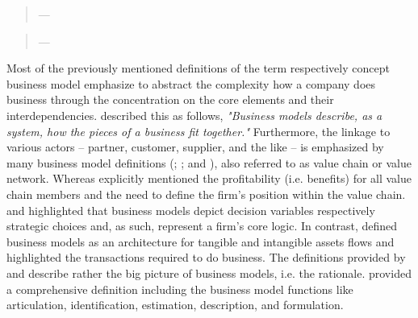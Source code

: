\begin{quotation}\vspace*{-5pt}{\slshape 
A business model \ldots consists of four interlocking elements [customer value proposition, profit formula, key resources, and key processes] that, taken together, create and deliver value.}
\vspace*{-7pt}
\begin{flushright}
	--- \citealp[p. 52]{Johnson2008}
\end{flushright}
\end{quotation}

\begin{quotation}\vspace*{-5pt}{\slshape 
A business model describes the rationale of how an organization creates, delivers and captures value.}
\vspace*{-7pt}
\begin{flushright}
	--- \citealp[p. 14]{Osterwalder2010}
\end{flushright}
\end{quotation}

Most of the previously mentioned definitions of the term respectively concept business model emphasize to abstract the complexity how a company does business through the concentration on the core elements and their interdependencies. \citet[p. 91]{Magretta2002} described this as follows, \textit{"Business models describe, as a system, how the pieces of a business fit together."} Furthermore, the linkage to various actors -- partner, customer, supplier, and the like -- is emphasized by many business model definitions (\citealp[p. 2]{Timmers1998}; \citealp[pp. 533-534]{Chesbrough2002}; and \citealp[p. 202]{Shafer2005}), also referred to as value chain or value network. Whereas \citet[p. 2]{Timmers1998} explicitly mentioned the profitability (i.e. benefits) for all value chain members and \citet[pp. 533-534]{Chesbrough2002} the need to define the firm's position within the value chain. \citet[p. 727]{Morris2005} and \citet[p. 202]{Shafer2005} highlighted that business models depict decision variables respectively strategic choices and, as such, represent a firm's core logic. In contrast, \citet[p. 2]{Timmers1998} defined business models as an architecture for tangible and intangible assets flows and \citet[p. 511]{Amit2001} highlighted the transactions required to do business. The definitions provided by \citet[p. 52]{Johnson2008} and \citet[p. 14]{Osterwalder2010} describe rather the big picture of business models, i.e. the rationale. \citet[p. 533-534]{Chesbrough2002} provided a comprehensive definition including the business model functions like articulation, identification, estimation, description, and formulation.

